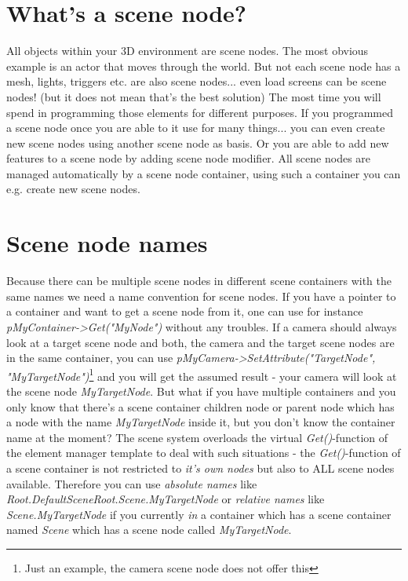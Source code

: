 \section{What's a scene node?}
All objects within your 3D environment are scene nodes. The most obvious example is an actor that moves through the world. But not each scene node has a mesh, lights, triggers etc. are also scene nodes... even load screens can be scene nodes! (but it does not mean that's the best solution) The most time you will spend in programming those elements for different purposes. If you programmed a scene node once you are able to it use for many things... you can even create new scene nodes using another scene node as basis. Or you are able to add new features to a scene node by adding scene node modifier. All scene nodes are managed automatically by a scene node container, using such a container you can e.g. create new scene nodes.




\section{Scene node names}
Because there can be multiple scene nodes in different scene containers with the same names we need a name convention for scene nodes. If you have a pointer to a container and want to get a scene node from it, one can use for instance \emph{pMyContainer->Get("MyNode")} without any troubles. If a camera should always look at a target scene node and both, the camera and the target scene nodes are in the same container, you can use \emph{pMyCamera->SetAttribute("TargetNode", "MyTargetNode")}\footnote{Just an example, the camera scene node does not offer this} and you will get the assumed result - your camera will look at the scene node \emph{MyTargetNode}. But what if you have multiple containers and you only know that there's a scene container children node or parent node which has a node with the name \emph{MyTargetNode} inside it, but you don't know the container name at the moment? The scene system overloads the virtual \emph{Get()}-function of the element manager template to deal with such situations - the \emph{Get()}-function of a scene container is not restricted to \emph{it's own nodes} but also to ALL scene nodes available. Therefore you can use \emph{absolute names} like \emph{Root.DefaultSceneRoot.Scene.MyTargetNode} or \emph{relative names} like \emph{Scene.MyTargetNode} if you currently \emph{in} a container which has a scene container named \emph{Scene} which has a scene node called \emph{MyTargetNode}.

